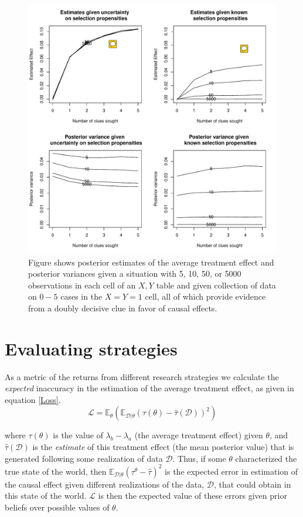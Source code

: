 \documentclass[12pt,]{book}
\begin{document}
\begin{figure}[h!]
\centering
\includegraphics[width=\textwidth]{Figures/Ns.pdf}
\caption{{Figure shows posterior estimates of the average treatment effect and posterior variances given a situation with 5, 10, 50, or 5000 observations in each cell of an $X,Y$ table and given collection of data on $0 - 5$ cases in the $X=Y=1$ cell, all of which provide evidence from a doubly decisive clue in favor of causal effects.}}
\label{morn}
\end{figure}

\hypertarget{evaluating-strategies}{%
\section{Evaluating strategies}\label{evaluating-strategies}}

As a metric of the returns from different research strategies we calculate the \emph{expected} inaccuracy in the estimation of the average treatment effect, as given in equation \ref{Loss}.
\begin{equation}
\mathcal{L}=\mathbb{E}_\theta(\mathbb{E}_{\mathcal{D}|\theta}(\tau(\theta)-\hat{\tau}(\mathcal{D}))^2) 
\label{Loss}
\end{equation}

where \(\tau(\theta)\) is the value of \(\lambda_b-\lambda_a\) (the average treatment effect) given \(\theta\), and \(\hat{\tau}(\mathcal{D})\) is the \emph{estimate} of this treatment effect (the mean posterior value) that is generated following some realization of data \(\mathcal{D}\). Thus, if some \(\theta\) characterized the true state of the world, then \(\mathbb{E}_{\mathcal{D}|\theta}(\tau^\theta-\hat{\tau})^2\) is the expected error in estimation of the causal effect given different realizations of the data, \(\mathcal{D}\), that could obtain in this state of the world. \(\mathcal{L}\) is then the expected value of these errors given prior beliefs over possible values of \(\theta\).
\end{document}
